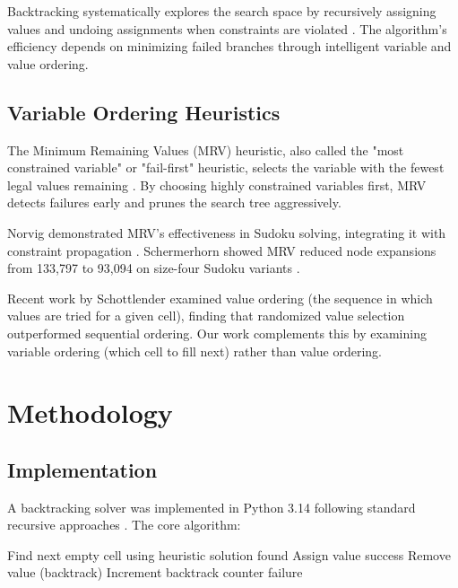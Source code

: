 \documentclass[conference]{IEEEtran}
\begin{document}
Backtracking systematically explores the search space by recursively assigning values and undoing assignments when constraints are violated \cite{russell_norvig}. The algorithm's efficiency depends on minimizing failed branches through intelligent variable and value ordering.

\subsection{Variable Ordering Heuristics}

The Minimum Remaining Values (MRV) heuristic, also called the "most constrained variable" or "fail-first" heuristic, selects the variable with the fewest legal values remaining \cite{norvig2006}. By choosing highly constrained variables first, MRV detects failures early and prunes the search tree aggressively.

Norvig demonstrated MRV's effectiveness in Sudoku solving, integrating it with constraint propagation \cite{norvig2006}. Schermerhorn showed MRV reduced node expansions from 133,797 to 93,094 on size-four Sudoku variants \cite{schermerhorn2009}.

Recent work by Schottlender \cite{schottlender2014} examined value ordering (the sequence in which values are tried for a given cell), finding that randomized value selection outperformed sequential ordering. Our work complements this by examining variable ordering (which cell to fill next) rather than value ordering.

\section{Methodology}

\subsection{Implementation}

A backtracking solver was implemented in Python 3.14 following standard recursive approaches \cite{russell_norvig}. The core algorithm:

\begin{algorithmic}
\STATE Find next empty cell using heuristic
    \RETURN solution found
\ENDIF
{}
        \STATE Assign value
            \RETURN success
        \ENDIF
        \STATE Remove value (backtrack)
        \STATE Increment backtrack counter
    \ENDIF
\ENDFOR
\RETURN failure
\end{algorithmic}
\end{document}
